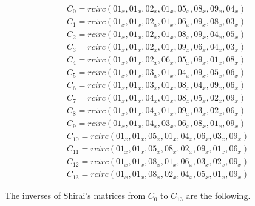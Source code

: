 \begin{gather}
C_0 = rcirc(01_x, 01_x, 02_x, 01_x, 05_x, 08_x, 09_x, 04_x)\label{shirai-0}\\
C_1 = rcirc(01_x, 01_x, 02_x, 01_x, 06_x, 09_x, 08_x, 03_x)\label{shirai-1}\\
C_2 = rcirc(01_x, 01_x, 02_x, 01_x, 08_x, 09_x, 04_x, 05_x)\label{shirai-2}\\
C_3 = rcirc(01_x, 01_x, 02_x, 01_x, 09_x, 06_x, 04_x, 03_x)\label{shirai-3}\\
C_4 = rcirc(01_x, 01_x, 02_x, 06_x, 05_x, 09_x, 01_x, 08_x)\label{shirai-4}\\
C_5 = rcirc(01_x, 01_x, 03_x, 01_x, 04_x, 09_x, 05_x, 06_x)\label{shirai-5}\\
C_6 = rcirc(01_x, 01_x, 03_x, 01_x, 08_x, 04_x, 09_x, 06_x)\label{shirai-6}\\
C_7 = rcirc(01_x, 01_x, 04_x, 01_x, 08_x, 05_x, 02_x, 09_x)\label{shirai-7}\\
C_8 = rcirc(01_x, 01_x, 04_x, 01_x, 09_x, 03_x, 02_x, 06_x)\label{shirai-8}\\
C_9 = rcirc(01_x, 01_x, 04_x, 03_x, 06_x, 08_x, 01_x, 09_x)\label{shirai-9}\\
C_{10} = rcirc(01_x, 01_x, 05_x, 01_x, 04_x, 06_x, 03_x, 09_x)\label{shirai-10}\\
C_{11} = rcirc(01_x, 01_x, 05_x, 08_x, 02_x, 09_x, 01_x, 06_x)\label{shirai-11}\\
C_{12} = rcirc(01_x, 01_x, 08_x, 01_x, 06_x, 03_x, 02_x, 09_x)\label{shirai-12}\\
C_{13} = rcirc(01_x, 01_x, 08_x, 02_x, 04_x, 05_x, 01_x, 09_x)\label{shirai-13}
\end{gather}

The inverses of Shirai's matrices from $C_0$ to $C_{13}$ are the following.

